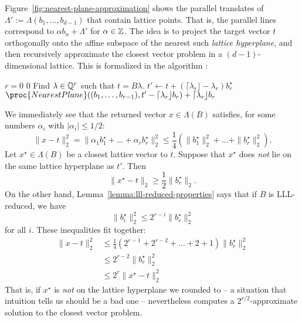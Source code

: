 Figure~\ref{fig:nearest-plane-approximation}
shows the parallel translates of $\Lambda' := \Lambda(b_1,\ldots,b_{d-1})$
that contain lattice points.
That is, the parallel lines correspond to $\alpha b_n + \Lambda'$ for $\alpha \in \mathbb{Z}$.
The idea is to project the target vector $t$ orthogonally onto the affine subspace
of the nearest such \emph{lattice hyperplane},
and then recursively approximate the closest vector problem in a $(d-1)$-dimensional lattice.
This is formalized in the algorithm :
\begin{codebox}
  \li \If $r = 0$
  \li \Then \Return $0$
      \End
  \li Find $\lambda \in \mathbb{Q}^r$ such that $t = B \lambda$.
  \li $t' \gets t + (\lceil \lambda_r \rfloor - \lambda_r) b_r^\star$
  \li \Return $\proc{NearestPlane}((b_1,\ldots,b_{r-1}), t' - \lceil \lambda_r \rfloor b_r) + \lceil \lambda_r \rfloor b_r$
\end{codebox}
We immediately see that the returned vector $x \in \Lambda(B)$ satisfies,
for some numbers $\alpha_i$ with $|\alpha_i| \leq 1/2$:
\[
  \| x - t \|_2^2 = \|\alpha_1 b_1^\star + \dots + \alpha_r b_r^\star \|_2^2 \leq \frac{1}{4}(\|b_1^\star\|_2^2 + \dots + \|b_r^\star\|_2^2).
\]
Let $x^\star \in \Lambda(B)$ be a closest lattice vector to $t$.
Suppose that $x^\star$ does \emph{not} lie on the same lattice hyperplane as $t'$.
Then
\[
  \| x^\star - t \|_2 \geq \frac{1}{2} \|b_r^\star\|_2.
\]
On the other hand,
Lemma~\ref{lemma:lll-reduced-properties} says that if $B$ is LLL-reduced, we have
\[
  \|b_i^\star\|_2^2 \leq 2^{r-i} \|b_r^\star\|_2^2
\]
for all $i$.
These inequalities fit together:
\begin{align*}
  \| x - t \|_2^2 &\leq \frac{1}{4} (2^{r-1} + 2^{r-2} + \dots + 2 + 1) \|b_r^\star\|_2^2 \\
    &\leq 2^{r-2} \|b_r^\star\|_2^2 \\
    &\leq 2^r \| x^\star - t \|_2^2
\end{align*}
That is, if $x^\star$ is \emph{not} on the lattice hyperplane we rounded to -- a situation
that intuition tells us should be a bad one --
 nevertheless computes a $2^{r/2}$-approximate solution to the closest vector problem.

